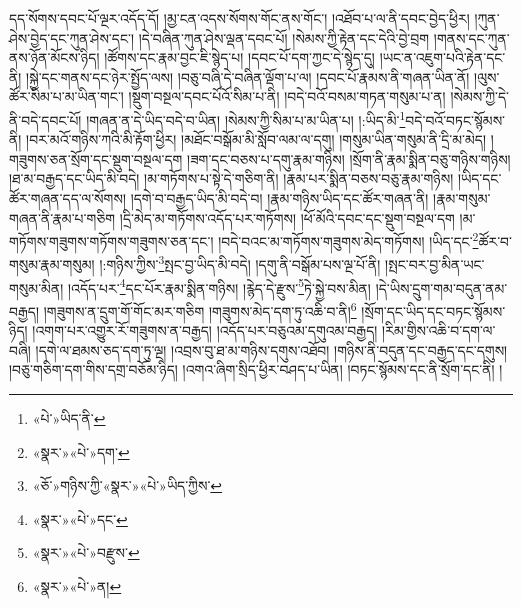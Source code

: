 དད་སོགས་དབང་པོ་ལྔར་འདོད་དོ། །མྱ་ངན་འདས་སོགས་གོང་ནས་གོང་། །འཐོབ་པ་ལ་ནི་དབང་བྱེད་ཕྱིར། །ཀུན་ཤེས་བྱེད་དང་ཀུན་ཤེས་དང་། །དེ་བཞིན་ཀུན་ཤེས་ལྡན་དབང་པོ། །སེམས་ཀྱི་རྟེན་དང་དེའི་བྱེ་བྲག །གནས་དང་ཀུན་ནས་ཉོན་མོངས་ཉིད། །ཚོགས་དང་རྣམ་བྱང་ཇི་སྙེད་པ། །དབང་པོ་དག་ཀྱང་དེ་སྙེད་དུ། །ཡང་ན་འཇུག་པའི་རྟེན་དང་ནི། །སྐྱེ་དང་གནས་དང་ཉེར་སྤྱོད་ལས། །བཅུ་བཞི་དེ་བཞིན་ལྡོག་པ་ལ། །དབང་པོ་རྣམས་ནི་གཞན་ཡིན་ནོ། །ལུས་ཚོར་སིམ་པ་མ་ཡིན་གང་། །སྡུག་བསྔལ་དབང་པོའོ་སིམ་པ་ནི། །བདེ་བའོ་བསམ་གཏན་གསུམ་པ་ན། །སེམས་ཀྱི་དེ་ནི་བདེ་དབང་པོ། །གཞན་ན་དེ་ཡིད་བདེ་བ་ཡིན། །སེམས་ཀྱི་སིམ་པ་མ་ཡིན་པ། །:ཡིད་མི་\footnote{«པེ་»ཡིད་ནི་}བདེ་བའོ་བཏང་སྙོམས་ནི། །བར་མའོ་གཉིས་ཀའི་མི་རྟོག་ཕྱིར། །མཐོང་བསྒོམ་མི་སློབ་ལམ་ལ་དགུ། །གསུམ་ཡིན་གསུམ་ནི་དྲི་མ་མེད། །གཟུགས་ཅན་སྲོག་དང་སྡུག་བསྔལ་དག །ཟག་དང་བཅས་པ་དགུ་རྣམ་གཉིས། །སྲོག་ནི་རྣམ་སྨིན་བཅུ་གཉིས་གཉིས། །ཐ་མ་བརྒྱད་དང་ཡིད་མི་བདེ། །མ་གཏོགས་པ་སྟེ་དེ་གཅིག་ནི། །རྣམ་པར་སྨིན་བཅས་བཅུ་རྣམ་གཉིས། །ཡིད་དང་ཚོར་གཞན་དད་ལ་སོགས། །དགེ་བ་བརྒྱད་ཡིད་མི་བདེ་བ། །རྣམ་གཉིས་ཡིད་དང་ཚོར་གཞན་ནི། །རྣམ་གསུམ་གཞན་ནི་རྣམ་པ་གཅིག །དྲི་མེད་མ་གཏོགས་འདོད་པར་གཏོགས། །ཕོ་མོའི་དབང་དང་སྡུག་བསྔལ་དག །མ་གཏོགས་གཟུགས་གཏོགས་གཟུགས་ཅན་དང་། །བདེ་བའང་མ་གཏོགས་གཟུགས་མེད་གཏོགས། །ཡིད་དང་\footnote{«སྣར་»«པེ་»དག་}ཚོར་བ་གསུམ་རྣམ་གསུམ། །:གཉིས་ཀྱིས་\footnote{«ཅོ་»གཉིས་ཀྱི་«སྣར་»«པེ་»ཡིད་ཀྱིས་}སྤང་བྱ་ཡིད་མི་བདེ། །དགུ་ནི་བསྒོམ་པས་ལྔ་པོ་ནི། །སྤང་བར་བྱ་མིན་ཡང་གསུམ་མིན། །འདོད་པར་\footnote{«སྣར་»«པེ་»དང་}དང་པོར་རྣམ་སྨིན་གཉིས། །རྙེད་དེ་རྫུས་\footnote{«སྣར་»«པེ་»བརྫུས་}ཏེ་སྐྱེ་བས་མིན། །དེ་ཡིས་དྲུག་གམ་བདུན་ནམ་བརྒྱད། །གཟུགས་ན་དྲུག་གོ་གོང་མར་གཅིག །གཟུགས་མེད་དག་ཏུ་འཆི་བ་ནི།\footnote{«སྣར་»«པེ་»ན།} །སྲོག་དང་ཡིད་དང་བཏང་སྙོམས་ཉིད། །འགག་པར་འགྱུར་རོ་གཟུགས་ན་བརྒྱད། །འདོད་པར་བཅུའམ་དགུའམ་བརྒྱད། །རིམ་གྱིས་འཆི་བ་དག་ལ་བཞི། །དགེ་ལ་ཐམས་ཅད་དག་ཏུ་ལྔ། །འབྲས་བུ་ཐ་མ་གཉིས་དགུས་འཐོབ། །གཉིས་ནི་བདུན་དང་བརྒྱད་དང་དགུས། །བཅུ་གཅིག་དག་གིས་དགྲ་བཅོམ་ཉིད། །འགའ་ཞིག་སྲིད་ཕྱིར་བཤད་པ་ཡིན། །བཏང་སྙོམས་དང་ནི་སྲོག་དང་ནི། །
